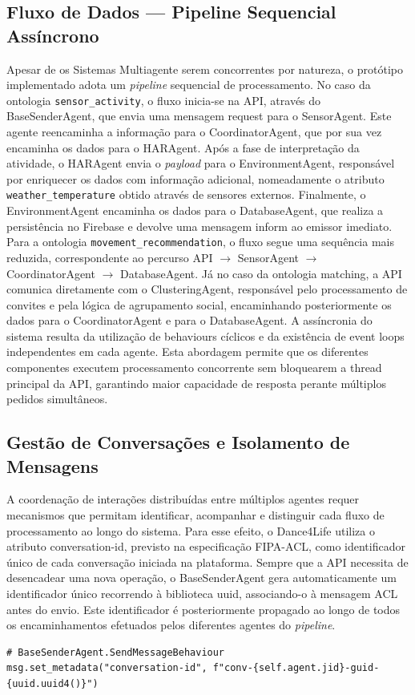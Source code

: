 \documentclass[runningheads]{llncs}
\begin{document}
\subsection{Fluxo de Dados — Pipeline Sequencial Assíncrono}
Apesar de os Sistemas Multiagente serem concorrentes por natureza, o protótipo implementado adota um \textit{pipeline} sequencial de processamento. No caso da ontologia \texttt{sensor\_activity}, o fluxo inicia-se na API, através do BaseSenderAgent, que envia uma mensagem request para o SensorAgent. Este agente reencaminha a informação para o CoordinatorAgent, que por sua vez encaminha os dados para o HARAgent.  
Após a fase de interpretação da atividade, o HARAgent envia o \textit{payload} para o EnvironmentAgent, responsável por enriquecer os dados com informação adicional, nomeadamente o atributo \texttt{weather\_temperature} obtido através de sensores externos. Finalmente, o EnvironmentAgent encaminha os dados para o DatabaseAgent, que  realiza a persistência no Firebase e devolve uma mensagem inform ao emissor imediato. 
Para a ontologia \texttt{movement\_recommendation}, o fluxo segue uma sequência mais reduzida, correspondente ao percurso API $\rightarrow$ SensorAgent $\rightarrow$ CoordinatorAgent $\rightarrow$ DatabaseAgent. Já no caso da ontologia matching, a API comunica diretamente com o ClusteringAgent, responsável pelo processamento de convites e pela lógica de agrupamento social, encaminhando posteriormente os dados para o CoordinatorAgent e para o DatabaseAgent. 
A assíncronia do sistema resulta da utilização de behaviours cíclicos e da existência de event loops independentes em cada agente. Esta abordagem permite que os diferentes componentes executem processamento concorrente sem bloquearem a thread principal da API, garantindo maior capacidade de resposta perante múltiplos pedidos simultâneos. 

\subsection{Gestão de Conversações e Isolamento de Mensagens}
A coordenação de interações distribuídas entre múltiplos agentes requer mecanismos que permitam identificar, acompanhar e distinguir cada fluxo de processamento ao longo do sistema. Para esse efeito, o Dance4Life utiliza o atributo conversation-id, previsto na especificação FIPA-ACL, como identificador único de cada conversação iniciada na plataforma. 
Sempre que a API necessita de desencadear uma nova operação, o BaseSenderAgent gera automaticamente um identificador único recorrendo à biblioteca uuid, associando-o à mensagem ACL antes do envio. Este identificador é posteriormente propagado ao longo de todos os encaminhamentos efetuados pelos diferentes agentes do \textit{pipeline}. 
\begin{lstlisting}
# BaseSenderAgent.SendMessageBehaviour
msg.set_metadata("conversation-id", f"conv-{self.agent.jid}-guid-{uuid.uuid4()}")
\end{lstlisting}
\end{document}
